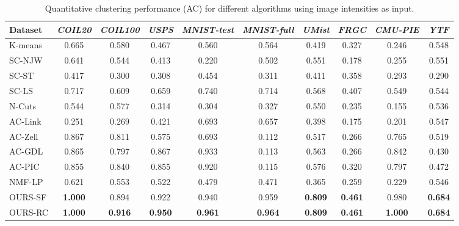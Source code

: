 \documentclass[10pt,twocolumn,letterpaper]{article}
\begin{document}
\begin{table*}[!ht]
\caption{{Quantitative clustering performance (AC) for different algorithms using image intensities as input.}}
\vspace{-5pt}
\center
\small
\begin{tabular}{@{}lccccccccc@{}}
  \toprule
   Dataset & \textit{COIL20} & \textit{COIL100} & \textit{USPS} & \textit{MNIST-test} & \textit{MNIST-full} & \textit{UMist} & \textit{FRGC} & \textit{CMU-PIE} & \textit{YTF} \\   
     
  \midrule
  K-means \cite{macqueen1967some}  &0.665 &0.580 &0.467 &0.560 &0.564 &0.419 &0.327 &0.246 &0.548 \\
  
  SC-NJW \cite{ng2002spectral}     &0.641 &0.544 &0.413  &0.220 &0.502 &0.551 &0.178 &0.255 &0.551 \\
      
  SC-ST \cite{zelnik2004self}      &0.417 &0.300 &0.308    
&0.454 &0.311 &0.411 &0.358 &0.293 &0.290  \\
  
  SC-LS \cite{chen2011large}    &0.717 &0.609 &0.659    
&0.740 &0.714 &0.568 &0.407 &0.549 &0.544 \\
  
  N-Cuts \cite{shi2000normalized}  &0.544 &0.577 &0.314   
&0.304 &0.327 &0.550 &0.235 &0.155 &0.536 \\
  
  AC-Link \cite{jain1999data}      &0.251 &0.269  &0.421    
&0.693 &0.657 &0.398 &0.175 &0.201 &0.547 \\
    
  AC-Zell \cite{zhao2009cyclizing} &0.867 &0.811  &0.575    
&0.693 &0.112 &0.517 &0.266 &0.765 &0.519  \\
  
  AC-GDL \cite{zhang2012graph}     &0.865 &0.797  &0.867   
&0.933 &0.113 &0.563 &0.266 &0.842 &0.430  \\   
  
  AC-PIC \cite{zhang2013agglomerative} &0.855 &0.840 &0.855    &0.920 &0.115 &0.576 &0.320 &0.797 &0.472 \\
  
  NMF-LP \cite{cai2009locality}    &0.621 &0.553 &0.522    
&0.479 &0.471 &0.365 &0.259 &0.229 &0.546 \\  
 {OURS-SF} &\textbf{1.000} & {0.894} & {0.922}   & {0.940} & 0.959 & \textbf{0.809} & \textbf{0.461}        & {0.980}    &  \textbf{0.684}   \\
 
 {OURS-RC} &\textbf{1.000} & \textbf{0.916} & \textbf{0.950}   & \textbf{0.961} &\textbf{0.964}  & \textbf{0.809} & \textbf{0.461}        & \textbf{1.000}    &  \textbf{0.684}   \\
  \bottomrule
  
\end{tabular}
\label{TB_Quantitative_Results_AC}
\end{table*}
\end{document}
